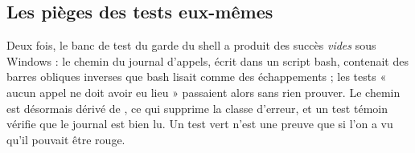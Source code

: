 \subsection{Les pièges des tests eux-mêmes}
Deux fois, le banc de test du garde du shell a produit des succès \emph{vides} sous Windows :
le chemin du journal d'appels, écrit dans un script bash, contenait des barres obliques
inverses que bash lisait comme des échappements ; les tests « aucun appel ne doit avoir eu
lieu » passaient alors sans rien prouver. Le chemin est désormais dérivé de , ce qui
supprime la classe d'erreur, et un test témoin vérifie que le journal est bien lu. Un test vert
n'est une preuve que si l'on a vu qu'il pouvait être rouge.
